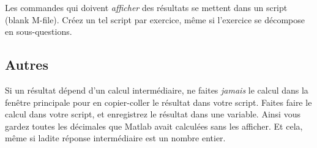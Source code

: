 Les commandes qui doivent \emph{afficher} des résultats se mettent dans un script (blank M-file). Créez un tel script par exercice, même si l'exercice se décompose en sous-questions.

\subsection{Autres}

Si un résultat dépend d'un calcul intermédiaire, ne faites \emph{jamais} le calcul dans la fenêtre principale pour en copier-coller le résultat dans votre script. Faites faire le calcul dans votre script, et enregistrez le résultat dans une variable. Ainsi vous gardez toutes les décimales que Matlab avait calculées sans les afficher. Et cela, même si ladite réponse intermédiaire est un nombre entier.


